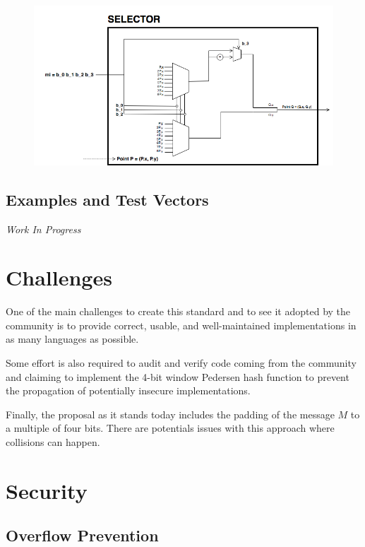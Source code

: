 \documentclass{article}
\begin{document}
\begin{spacing}{1.2}
		\begin{figure}[h]
			\centering
			\includegraphics[scale=0.5]{../../figures/pedersen-multiplication-selector.png}
		\end{figure}

	\subsection{Examples and Test Vectors}

	\emph{Work In Progress}

\section{Challenges}

One of the main challenges to create this standard and to see it adopted by the community is to provide correct, usable, and well-maintained implementations in as many languages as possible.

Some effort is also required to audit and verify code coming from the community and claiming to implement the 4-bit window Pedersen hash function to prevent the propagation of potentially insecure implementations.

Finally, the proposal as it stands today includes the padding of the message $M$ to a multiple of four bits. There are potentials issues with this approach where collisions can happen.

\section{Security}

	\subsection{Overflow Prevention}
	

\end{spacing}
\end{document}
